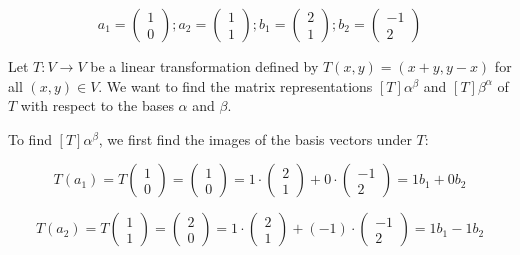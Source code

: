 \documentclass[fontsize=12pt]{scrartcl}
\begin{document}
$$a_1 = \left(\begin{array}{c} 1 \\ 0 \end{array} \right); a_2 = \left(\begin{array}{c} 1 \\ 1 \end{array} \right); b_1 = \left(\begin{array}{c} 2 \\ 1 \end{array} \right); b_2 = \left(\begin{array}{c} -1 \\ 2 \end{array} \right)$$

\noindent
Let $T: V \rightarrow V$ be a linear transformation defined by $T(x,y) = (x+y, y-x)$ for all $(x,y) \in V$. We want to find the matrix representations $\left[T\right]{\alpha}^{\beta}$ and $\left[T\right]{\beta}^{\alpha}$ of $T$ with respect to the bases $\alpha$ and $\beta$.

\noindent
To find $\left[T\right]{\alpha}^{\beta}$, we first find the images of the basis vectors under $T$:

$$T(a_1) = T\left(\begin{array}{c} 1 \\ 0 \end{array} \right) = \left(\begin{array}{c} 1 \\ 0 \end{array} \right) = 1\cdot \left(\begin{array}{c} 2 \\ 1 \end{array} \right) + 0 \cdot \left(\begin{array}{c} -1 \\ 2 \end{array} \right) = 1b_1 + 0b_2$$

$$T(a_2) = T\left(\begin{array}{c} 1 \\ 1 \end{array} \right) = \left(\begin{array}{c} 2 \\ 0 \end{array} \right) = 1\cdot \left(\begin{array}{c} 2 \\ 1 \end{array} \right) + (-1) \cdot \left(\begin{array}{c} -1 \\ 2 \end{array} \right) = 1b_1 - 1b_2$$
\end{document}

